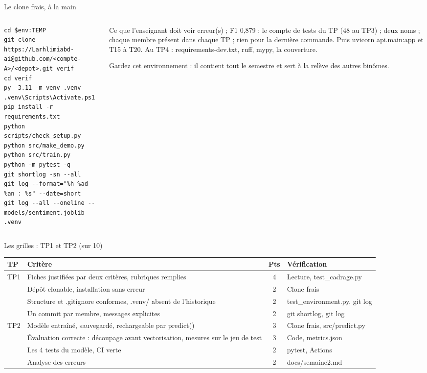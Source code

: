 \documentclass[aspectratio=169,11pt]{beamer}
\newcommand{\co}[1]{{\ttfamily\hyphenchar\font=45\relax #1}}
\begin{document}
\begin{frame}[fragile]{Le clone frais, à la main}
\begin{columns}[T]
\begin{column}{0.55\textwidth}
\begin{lstlisting}
cd $env:TEMP
git clone https://Larhlimiabd-ai@github.com/<compte-A>/<depot>.git verif
cd verif
py -3.11 -m venv .venv
.venv\Scripts\Activate.ps1
pip install -r requirements.txt
python scripts/check_setup.py
python src/make_demo.py
python src/train.py
python -m pytest -q
git shortlog -sn --all
git log --format="%h %ad %an : %s" --date=short
git log --all --oneline -- models/sentiment.joblib .venv
\end{lstlisting}
\end{column}
\begin{column}{0.42\textwidth}
\begin{exampleblock}{Ce que l'enseignant doit voir}
\scriptsize \co{0 erreur(s)} ; F1 0,879 ; le compte de tests du TP (48 au TP3) ; deux noms ; chaque membre
présent dans chaque TP ; rien pour la dernière commande. Puis \co{uvicorn api.main:app} et T15 à T20. Au TP4 :
\co{requirements-dev.txt}, \co{ruff}, \co{mypy}, la couverture.
\end{exampleblock}
\scriptsize Gardez cet environnement : il contient tout le semestre et sert à la relève des autres binômes.
\end{column}
\end{columns}
\end{frame}

\begin{frame}{Les grilles : TP1 et TP2 (sur 10)}
\scriptsize
\begin{tabularx}{\textwidth}{@{}l X c >{\raggedright\arraybackslash}p{4.4cm}@{}}
\toprule
\textbf{TP} & \textbf{Critère} & \textbf{Pts} & \textbf{Vérification} \\
\midrule
TP1 & Fiches justifiées par deux critères, rubriques remplies & 4 & Lecture, \co{test\_cadrage.py} \\
    & Dépôt clonable, installation sans erreur & 2 & Clone frais \\
    & Structure et \co{.gitignore} conformes, \co{.venv/} absent de l'historique & 2 & \co{test\_environment.py}, \co{git log} \\
    & Un commit par membre, messages explicites & 2 & \co{git shortlog}, \co{git log} \\
\midrule
TP2 & Modèle entraîné, sauvegardé, rechargeable par \co{predict()} & 3 & Clone frais, \co{src/predict.py} \\
    & Évaluation correcte : découpage avant vectorisation, mesures sur le jeu de test & 3 & Code, \co{metrics.json} \\
    & Les 4 tests du modèle, CI verte & 2 & pytest, Actions \\
    & Analyse des erreurs & 2 & \co{docs/semaine2.md} \\
\bottomrule
\end{tabularx}
\end{frame}
\end{document}
